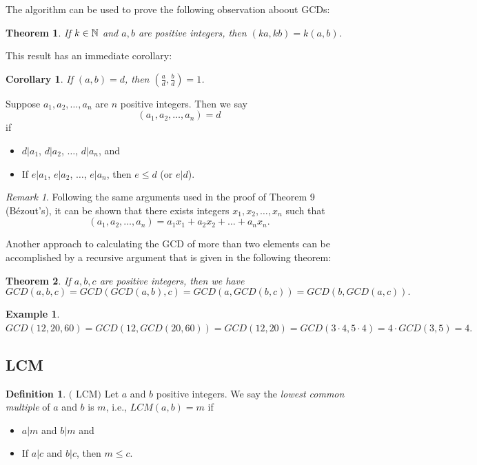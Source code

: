 \documentclass[12pt]{article}
\theoremstyle{plain}
\newtheorem{corollary}{Corollary}
\newtheorem{example}{Example}
\newtheorem{theorem}{Theorem}
\theoremstyle{definition}
\newtheorem{definition}{Definition}
\theoremstyle{remark}
\newtheorem{remark}{Remark}
\begin{document}
\bigskip
The algorithm can be used to prove the following observation aboout GCDs:
\begin{theorem}\label{factorout}
If $k\in \mathbb{N}$ and $a, b$ are positive integers, then $(ka, kb) = k(a,b)$.
\end{theorem}

\bigskip
This result has an immediate corollary:
\begin{corollary}
If $(a,b)=d$, then $(\frac{a}{d}, \frac{b}{d}) =1$. 
\end{corollary}

\bigskip
{} Suppose $a_1, a_2, \dots, a_n$ are $n$ positive integers. Then we say 
$$(a_1, a_2, \dots, a_n) = d$$ if 
\begin{itemize}
    \item $d|a_1$, $d|a_2$, $\dots$, $d|a_n$, and 
    \item If $e|a_1$, $e|a_2$, $\dots$, $e|a_n$, then $e\leq d$ (or $e|d$). 
\end{itemize}

\begin{remark}
Following the same arguments used in the proof of Theorem 9 (B\'ezout's), it can be shown that there exists integers $x_1, x_2, \dots, x_n$ such that 
$$(a_1, a_2, \dots, a_n) = a_1x_1+a_2x_2+\dots +a_nx_n.$$
\end{remark}

\bigskip
\noindent
Another approach to calculating the GCD of more than two elements can be accomplished by a recursive argument that is given in the following theorem:
\begin{theorem}
If $a, b, c$ are positive integers, then we have
$$GCD(a,b,c) = GCD(GCD(a,b),c) = GCD(a, GCD(b,c)) = GCD(b,GCD(a,c)).$$
\end{theorem}

\bigskip
\begin{example}
$GCD(12, 20, 60) = GCD(12,GCD(20,60)) = GCD(12,20)=GCD(3\cdot 4, 5\cdot 4) = 4\cdot GCD(3,5)=4.$
\end{example}

\subsection{LCM}
\begin{definition}$($ LCM$)$
Let $a$ and $b$ positive integers. We say the {\it lowest common multiple} of $a$ and $b$ is $m$, i.e., $LCM(a,b) = m$ if 
\begin{itemize}
    \item $a|m$ and $b|m$ and
    \item If $a|c$ and $b|c$, then $m\leq c$. 
\end{itemize}
\end{definition}
\end{document}
